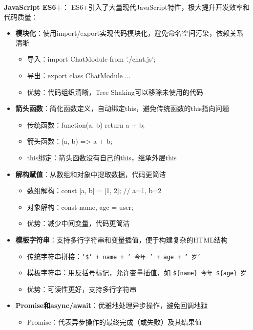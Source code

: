 \documentclass[12pt,a4paper]{article}
\begin{document}
\textbf{JavaScript ES6+}：
ES6+引入了大量现代JavaScript特性，极大提升开发效率和代码质量：

\begin{itemize}
    \item \textbf{模块化}：使用import/export实现代码模块化，避免命名空间污染，依赖关系清晰
        \begin{itemize}
            \item 导入：import { ChatModule } from './chat.js';
            \item 导出：export class ChatModule { ... }
            \item 优势：代码组织清晰，Tree Shaking可以移除未使用的代码
        \end{itemize}
    \item \textbf{箭头函数}：简化函数定义，自动绑定this，避免传统函数的this指向问题
        \begin{itemize}
            \item 传统函数：function(a, b) { return a + b; }
            \item 箭头函数：(a, b) => a + b;
            \item this绑定：箭头函数没有自己的this，继承外层this
        \end{itemize}
    \item \textbf{解构赋值}：从数组和对象中提取数据，代码更简洁
        \begin{itemize}
            \item 数组解构：const [a, b] = [1, 2]; // a=1, b=2
            \item 对象解构：const {name, age} = user;
            \item 优势：减少中间变量，代码更简洁
        \end{itemize}
    \item \textbf{模板字符串}：支持多行字符串和变量插值，便于构建复杂的HTML结构
        \begin{itemize}
            \item 传统字符串拼接：\texttt{'\$' + name + ' 今年 ' + age + ' 岁'}
            \item 模板字符串：用反括号标记，允许变量插值，如 \texttt{\$\{name\} 今年 \$\{age\} 岁}
            \item 优势：可读性更好，支持多行字符串
        \end{itemize}
    \item \textbf{Promise和async/await}：优雅地处理异步操作，避免回调地狱
        \begin{itemize}
            \item Promise：代表异步操作的最终完成（或失败）及其结果值

\end{itemize}
\end{itemize}
\end{document}
